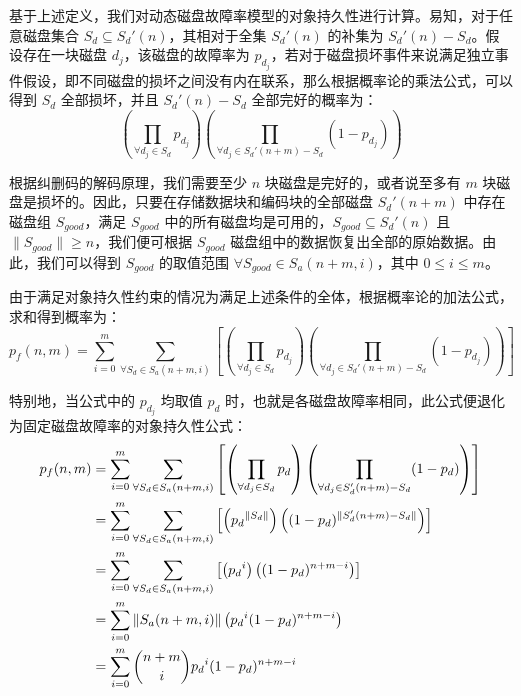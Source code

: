 基于上述定义，我们对动态磁盘故障率模型的对象持久性进行计算。易知，对于任意磁盘集合 $S_{d}{\subseteq}S_{d}'(n)$，其相对于全集 $S_{d}'(n)$ 的补集为 $S_{d}'(n)-S_{d}$。假设存在一块磁盘 $d_j$，该磁盘的故障率为 $p_{d_j}$，若对于磁盘损坏事件来说满足独立事件假设，即不同磁盘的损坏之间没有内在联系，那么根据概率论的乘法公式，可以得到 $S_{d}$ 全部损坏，并且 $S_{d}'(n)-S_{d}$ 全部完好的概率为：
\begin{equation}
\left(\prod_{{\forall}d_{j}{\in}S_{d}}{p_{d_j}}\right)\left(\prod_{{\forall}d_{j}{\in}S_{d}'(n+m)-S_{d}}(1-p_{d_j})\right)
\end{equation}

根据纠删码的解码原理，我们需要至少 $n$ 块磁盘是完好的，或者说至多有 $m$ 块磁盘是损坏的。因此，只要在存储数据块和编码块的全部磁盘 $S_{d}'(n+m)$ 中存在磁盘组 $S_{good}$，满足 $S_{good}$ 中的所有磁盘均是可用的，$S_{good}{\subseteq}S_{d}'(n)$ 且 $\|S_{good}\| \geq n$，我们便可根据 $S_{good}$ 磁盘组中的数据恢复出全部的原始数据。由此，我们可以得到 $S_{good}$ 的取值范围 ${\forall}S_{good}{\in}S_{a}(n+m,i)$，其中 $0 \leq i \leq m$。

由于满足对象持久性约束的情况为满足上述条件的全体，根据概率论的加法公式，求和得到概率为：
\begin{equation}
p_{f}(n,m)=\sum_{i=0}^{m}\sum_{{\forall}S_{d}{\in}S_{a}(n+m,i)}\left[\left(\prod_{{\forall}d_{j}{\in}S_{d}}{p_{d_j}}\right)\left(\prod_{{\forall}d_{j}{\in}S_{d}'(n+m)-S_{d}}(1-p_{d_j})\right)\right]
\end{equation}

特别地，当公式中的 $p_{d_j}$ 均取值 $p_d$ 时，也就是各磁盘故障率相同，此公式便退化为固定磁盘故障率的对象持久性公式：
\begin{equation}
\begin{split}
p_{f}(n,m)&=\sum_{i=0}^{m}\sum_{{\forall}S_{d}{\in}S_{a}(n+m,i)}\left[\left(\prod_{{\forall}d_{j}{\in}S_{d}}{p_d}\right)\left(\prod_{{\forall}d_{j}{\in}S_{d}'(n+m)-S_{d}}(1-p_d)\right)\right]\\
&=\sum_{i=0}^{m}\sum_{{\forall}S_{d}{\in}S_{a}(n+m,i)}\left[\left({p_d}^{\|S_{d}\|}\right)\left((1-p_d)^{\|S_{d}'(n+m)-S_{d}\|}\right)\right]\\
&=\sum_{i=0}^{m}\sum_{{\forall}S_{d}{\in}S_{a}(n+m,i)}\left[\left({p_d}^{i}\right)\left((1-p_d)^{n+m-i}\right)\right]\\
&=\sum_{i=0}^{m}\|S_{a}(n+m,i)\|\left({p_d}^{i}(1-p_d)^{n+m-i}\right)\\
&=\sum_{i=0}^{m}\dbinom{n+m}{i}{p_d}^{i}(1-p_d)^{n+m-i}
\end{split}
\end{equation}
